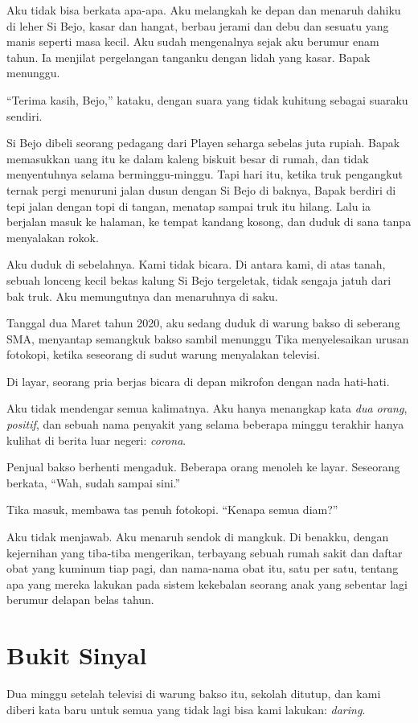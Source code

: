\documentclass[11pt,twoside,openany]{book}
\makeatletter
\newcommand{\scenebreak}{\par\vspace{0.9em}{\centering\textsc{*\hspace{0.7em}*\hspace{0.7em}*}\par}\vspace{0.9em}\@afterindentfalse\@afterheading}
\makeatother
\begin{document}
Aku tidak bisa berkata apa-apa. Aku melangkah ke depan dan menaruh dahiku di leher Si Bejo, kasar dan hangat, berbau jerami dan debu dan sesuatu yang manis seperti masa kecil. Aku sudah mengenalnya sejak aku berumur enam tahun. Ia menjilat pergelangan tanganku dengan lidah yang kasar. Bapak menunggu.

``Terima kasih, Bejo,'' kataku, dengan suara yang tidak kuhitung sebagai suaraku sendiri.

Si Bejo dibeli seorang pedagang dari Playen seharga sebelas juta rupiah. Bapak memasukkan uang itu ke dalam kaleng biskuit besar di rumah, dan tidak menyentuhnya selama berminggu-minggu. Tapi hari itu, ketika truk pengangkut ternak pergi menuruni jalan dusun dengan Si Bejo di baknya, Bapak berdiri di tepi jalan dengan topi di tangan, menatap sampai truk itu hilang. Lalu ia berjalan masuk ke halaman, ke tempat kandang kosong, dan duduk di sana tanpa menyalakan rokok.

Aku duduk di sebelahnya. Kami tidak bicara. Di antara kami, di atas tanah, sebuah lonceng kecil bekas kalung Si Bejo tergeletak, tidak sengaja jatuh dari bak truk. Aku memungutnya dan menaruhnya di saku.

\scenebreak
Tanggal dua Maret tahun 2020, aku sedang duduk di warung bakso di seberang SMA, menyantap semangkuk bakso sambil menunggu Tika menyelesaikan urusan fotokopi, ketika seseorang di sudut warung menyalakan televisi.

Di layar, seorang pria berjas bicara di depan mikrofon dengan nada hati-hati.

Aku tidak mendengar semua kalimatnya. Aku hanya menangkap kata \emph{dua orang}, \emph{positif}, dan sebuah nama penyakit yang selama beberapa minggu terakhir hanya kulihat di berita luar negeri: \emph{corona}.

Penjual bakso berhenti mengaduk. Beberapa orang menoleh ke layar. Seseorang berkata, ``Wah, sudah sampai sini.''

Tika masuk, membawa tas penuh fotokopi. ``Kenapa semua diam?''

Aku tidak menjawab. Aku menaruh sendok di mangkuk. Di benakku, dengan kejernihan yang tiba-tiba mengerikan, terbayang sebuah rumah sakit dan daftar obat yang kuminum tiap pagi, dan nama-nama obat itu, satu per satu, tentang apa yang mereka lakukan pada sistem kekebalan seorang anak yang sebentar lagi berumur delapan belas tahun.

\chapter{Bukit Sinyal}
Dua minggu setelah televisi di warung bakso itu, sekolah ditutup, dan kami diberi kata baru untuk semua yang tidak lagi bisa kami lakukan: \emph{daring}.
\end{document}
